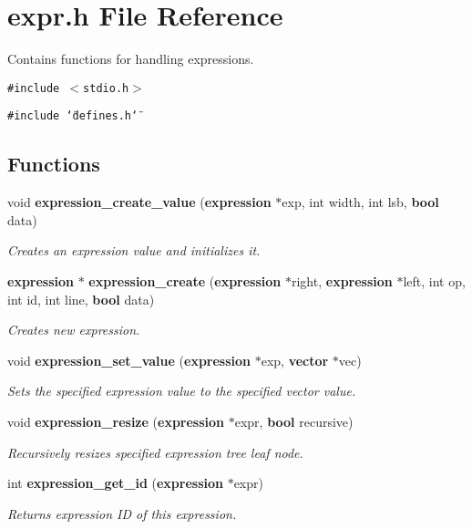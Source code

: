 \section{expr.h File Reference}
\label{expr_8h}
Contains functions for handling expressions. 


{\tt \#include $<$stdio.h$>$}\par
{\tt \#include \char`\"{}defines.h\char`\"{}}\par
\subsection*{Functions}
\begin{CompactItemize}
\item 
void {\bf expression\_\-create\_\-value} ({\bf expression} $\ast$exp, int width, int lsb, {\bf bool} data)
\begin{CompactList}\small\item\em Creates an expression value and initializes it.\item\end{CompactList}\item 
{\bf expression} $\ast$ {\bf expression\_\-create} ({\bf expression} $\ast$right, {\bf expression} $\ast$left, int op, int id, int line, {\bf bool} data)
\begin{CompactList}\small\item\em Creates new expression.\item\end{CompactList}\item 
void {\bf expression\_\-set\_\-value} ({\bf expression} $\ast$exp, {\bf vector} $\ast$vec)
\begin{CompactList}\small\item\em Sets the specified expression value to the specified vector value.\item\end{CompactList}\item 
void {\bf expression\_\-resize} ({\bf expression} $\ast$expr, {\bf bool} recursive)
\begin{CompactList}\small\item\em Recursively resizes specified expression tree leaf node.\item\end{CompactList}\item 
int {\bf expression\_\-get\_\-id} ({\bf expression} $\ast$expr)
\begin{CompactList}\small\item\em Returns expression ID of this expression.\item\end{CompactList}\item 

\end{CompactItemize}

